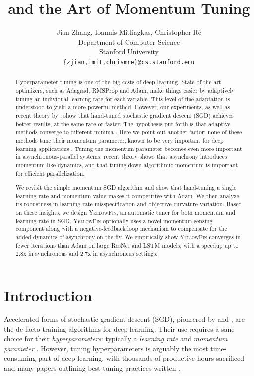 \documentclass{article}
\title{\tuner and the Art of Momentum Tuning}
\author{
  Jian Zhang, Ioannis Mitliagkas, Christopher R\'e \\
  Department of Computer Science\\
  Stanford University\\
  \texttt{\{zjian,imit,chrismre\}@cs.stanford.edu} \\
}
\newcommand{\tuner}{\textsc{YellowFin}\xspace}
\newcommand{\outline}[1]{}
\begin{document}
\maketitle

\begin{abstract}
\noindent Hyperparameter tuning is one of the big costs of deep learning. 
State-of-the-art optimizers, such as Adagrad, RMSProp and  Adam,
make things easier by adaptively tuning an individual learning rate for each variable.
This level of fine adaptation is understood to yield a more powerful method.
However, our experiments, as well as recent theory by \citet{wilson2017marginal}, 
show that hand-tuned stochastic gradient descent (SGD) achieves better results, at the same rate or faster.
The hypothesis put forth is that adaptive methods converge to different minima \cite{wilson2017marginal}.
Here we point out another factor: none of these methods tune their momentum parameter,
known to be very important for deep learning applications \cite{sutskever2013importance}.
Tuning the momentum parameter becomes even more important in asynchronous-parallel systems:
recent theory \cite{mitliagkas2016asynchrony} shows that asynchrony introduces momentum-like dynamics,
and that tuning down algorithmic momentum is important for efficient parallelization.  

We revisit the simple momentum SGD algorithm and show that hand-tuning a single learning rate and momentum value makes it competitive with Adam.
We then analyze its robustness in learning rate misspecification and objective curvature variation.
Based on these insights, we design \tuner, an automatic tuner for both momentum and learning rate in SGD.
\tuner optionally uses a novel momentum-sensing component along with a negative-feedback loop mechanism to compensate for the added dynamics of asynchrony on the fly.
We empirically show \tuner converges in fewer iterations than Adam on large ResNet and LSTM models,
	with a speedup up to $2.8$x in synchronous and $2.7$x in asynchronous settings.%
\end{abstract}





\section{Introduction}


\outline{[Problem.]}
Accelerated forms of stochastic gradient descent (SGD), pioneered by
\citet{polyak1964some} and \citet{nesterov1983method}, are the de-facto
training algorithms for deep learning.
Their use requires a sane choice for their {\em hyperparameters}: 
typically a {\em learning rate} and {\em momentum parameter} \citep{sutskever2013importance}.
However, tuning hyperparameters is arguably the most time-consuming part of deep learning, with thousands of productive hours sacrificed and many papers outlining best tuning practices written
\cite{bengio2012practical,orr2003neural,bengio2012deep,bottou2012stochastic}.
\end{document}
